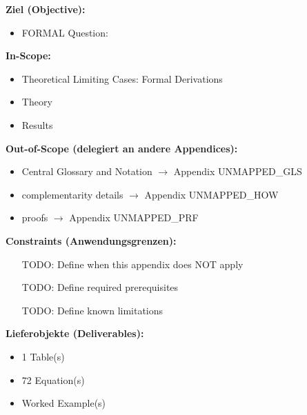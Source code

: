

\begin{tcolorbox}[
    colback=orange!5!white,
    colframe=orange!75!black,
    title={\textbf{Appendix Scope: Ziel / In-Scope / Out-of-Scope / Constraints}},
    fonttitle=\bfseries
]

\textbf{Ziel (Objective):}
\begin{itemize}[nosep]
    \item FORMAL Question:
\end{itemize}

\textbf{In-Scope:}
\begin{itemize}[nosep]
    \item Theoretical Limiting Cases: Formal Derivations
    \item Theory
    \item Results
\end{itemize}

\textbf{Out-of-Scope (delegiert an andere Appendices):}
\begin{itemize}[nosep]
    \item Central Glossary and Notation $\rightarrow$ Appendix UNMAPPED_GLS
    \item complementarity details $\rightarrow$ Appendix UNMAPPED_HOW
    \item proofs $\rightarrow$ Appendix UNMAPPED_PRF
\end{itemize}

\textbf{Constraints (Anwendungsgrenzen):}
\begin{itemize}[nosep]
    \item [TODO: Define when this appendix does NOT apply]
    \item [TODO: Define required prerequisites]
    \item [TODO: Define known limitations]
\end{itemize}

\textbf{Lieferobjekte (Deliverables):}
\begin{itemize}[nosep]
    \item 1 Table(s)
    \item 72 Equation(s)
    \item Worked Example(s)
\end{itemize}

\end{tcolorbox}


